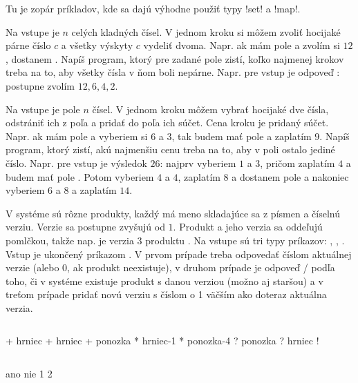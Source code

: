 Tu je zopár príkladov, kde sa dajú výhodne použiť typy \prg!set! a \prg!map!.

\begin{uloha}
  Na vstupe je $n$ celých kladných čísel. V jednom kroku si môžem zvoliť hocijaké
  párne číslo $c$ a všetky výskyty $c$ vydeliť dvoma. Napr. ak mám pole
   a zvolím si $12$, dostanem .
  Napíš program, ktorý pre zadané pole zistí, koľko najmenej krokov treba 
  na to, aby všetky čísla v ňom boli nepárne. Napr. pre vstup 
   je odpoveď  : postupne zvolím $12, 6, 4, 2$.
\end{uloha}

\begin{uloha}
  Na vstupe je pole $n$ čísel. V jednom kroku môžem vybrať hocijaké dve čísla, odstrániť
  ich z poľa a pridať do poľa ich súčet. Cena kroku je pridaný súčet. Napr. ak mám
  pole  a vyberiem si $6$ a $3$, tak budem mať pole  a 
  zaplatím $9$. Napíš program, ktorý zistí, akú najmenšiu cenu treba na to, aby
  v poli ostalo jediné číslo. Napr. pre vstup   je výsledok $26$:
  najprv vyberiem $1$ a $3$, pričom zaplatím $4$ a budem mať pole .
  Potom vyberiem $4$ a $4$, zaplatím $8$ a dostanem pole  a nakoniec
  vyberiem $6$ a $8$ a zaplatím $14$.
\end{uloha}

\begin{uloha}
  V systéme sú rôzne produkty, každý má meno skladajúce sa z písmen a číselnú
  verziu. Verzie sa postupne zvyšujú od $1$. Produkt a jeho verzia sa oddeľujú
  pomlčkou, takže nap.  je verzia $3$ produktu .
  Na vstupe sú tri typy príkazov: , , 
  \hbox{}. Vstup je ukončený príkazom \vb{!}.
  V prvom prípade treba odpovedať číslom aktuálnej verzie (alebo $0$,
  ak produkt neexistuje), v druhom prípade je odpoveď / podľa toho,
  či v systéme existuje produkt s danou verziou (možno aj staršou) a v treťom prípade 
  pridať novú verziu s číslom o 1 väčším ako doteraz aktuálna verzia.

  
\begin{column}{0.45}
\begin{outputBox}
+ hrniec
+ hrniec
+ ponozka
* hrniec-1
* ponozka-4
? ponozka
? hrniec
!
\end{outputBox}
\end{column}
\begin{column}{0.45}
\begin{outputBox}
ano
nie
1
2
\end{outputBox}
\end{column}
\end{uloha}


